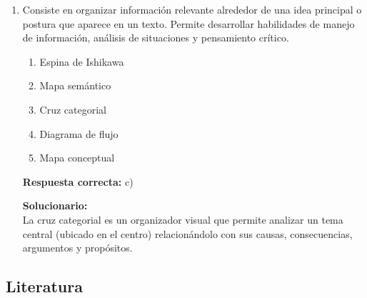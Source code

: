 \begin{enumerate}
	\vspace{2mm}
	\textbf{Solucionario:}\\
	El enunciado tiene una función informativa o referencial; busca definir o explicar qué es la telenovela dentro del contexto televisivo.
	
	\vspace{6mm}
	
	\item Consiste en organizar información relevante alrededor de una idea principal o postura que aparece en un texto. Permite desarrollar habilidades de manejo de información, análisis de situaciones y pensamiento crítico.
	\begin{enumerate}[label=\alph*)]
		\item Espina de Ishikawa
		\item Mapa semántico
		\item Cruz categorial
		\item Diagrama de flujo
		\item Mapa conceptual
	\end{enumerate}
	\textbf{Respuesta correcta:} c)
	
	\vspace{2mm}
	\textbf{Solucionario:}\\
	La cruz categorial es un organizador visual que permite analizar un tema central (ubicado en el centro) relacionándolo con sus causas, consecuencias, argumentos y propósitos.
	
	\vspace{6mm}
\end{enumerate}

\subsection*{Literatura}


